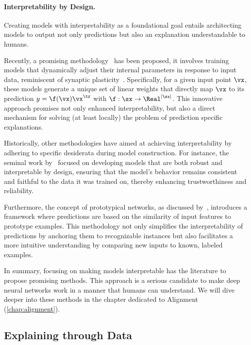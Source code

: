 \paragraph{Interpretability by Design.} Creating models with interpretability as a foundational goal entails architecting models to output not only predictions but also an explanation understandable to humans. 

Recently, a promising methodology~\cite{bohle2022b,bohle2023holistically} has been proposed, it involves training models that dynamically adjust their internal parameters in response to input data, reminiscent of synaptic plasticity~\cite{abraham1996metaplasticity}. Specifically, for a given input point $\vx$, these models generate a unique set of linear weights that directly map $\vx$ to its prediction $y = \f(\vx) \vx^\tr$ with $\f : \sx \to \Real^{|\sx|}$. This innovative approach promises not only enhanced interpretability, but also a direct mechanism for solving (at least locally) the problem of prediction specific explanations.

Historically, other methodologies have aimed at achieving interpretability by adhering to specific desiderata during model construction. For instance, the seminal work by~\cite{alvarezmelis2018robust} focused on developing models that are both robust and interpretable by design, ensuring that the model's behavior remains consistent and faithful to the data it was trained on, thereby enhancing trustworthiness and reliability.

Furthermore, the concept of prototypical networks, as discussed by~\cite{rudin2019stop}, introduces a framework where predictions are based on the similarity of input features to prototype examples. This methodology not only simplifies the interpretability of predictions by anchoring them to recognizable instances but also facilitates a more intuitive understanding by comparing new inputs to known, labeled examples.

In summary, focusing on making models interpretable has the literature to propose promising methods. This approach is a serious candidate to make deep neural networks work in a manner that humans can understand. We will  dive deeper into these methods in the chapter dedicated to Alignment (\autoref{chap:alignment}).

\subsection{Explaining through Data}

